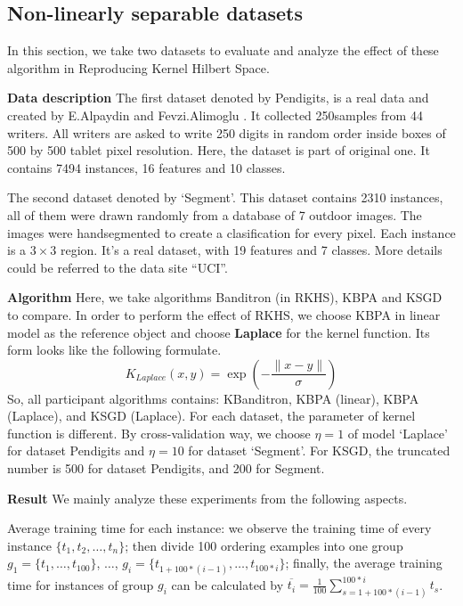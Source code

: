 \documentclass[twocolumn]{article}
\begin{document}
\subsection{Non-linearly separable datasets}

In this section, we take two datasets to evaluate and analyze the effect of these algorithm in Reproducing Kernel Hilbert Space.

\vspace{1.5ex}
\textbf{Data description}
The first dataset denoted by Pendigits, is a real data and created by E.Alpaydin and Fevzi.Alimoglu \cite{alimoglu1996combining,Alimoglu96methodsof}. 
It  collected 250samples from 44 writers. All writers are asked to write 250 digits in random order inside boxes of 500 by 500 tablet pixel resolution. 
Here, the dataset is part of original one. It contains 7494 instances, 16 features and 10 classes. 

The second dataset denoted by `Segment'\cite{Lichman:2013}. This dataset contains 2310 instances, all of them were drawn randomly from a database of 7 outdoor images. The images were handsegmented to create a clasification for every pixel. Each instance is a $3\times 3$ region. It's a real dataset, with 19 features and 7 classes. More details could be referred to the data site ``UCI''.

\vspace{1.5ex}
\textbf{Algorithm}
Here, we take algorithms Banditron (in RKHS), KBPA and KSGD to compare. In order to perform the effect of RKHS, we choose KBPA in linear model as the reference object and choose \textbf{Laplace} for the kernel function. Its form looks like the following formulate.
\[K_{Laplace}(x,y) = \exp{\left(-\frac{\parallel{x-y}\parallel}{\sigma}\right)}\]
So, all participant algorithms contains: KBanditron, KBPA (linear), KBPA (Laplace), and KSGD (Laplace). For each dataset, the parameter of kernel function is different. By cross-validation way, we choose $\eta = 1$ of model `Laplace' for dataset Pendigits and $\eta = 10$ for dataset `Segment'. For KSGD, the truncated number is 500 for dataset Pendigits, and 200 for Segment.

\vspace{1.5ex}
\textbf{Result}
We mainly analyze these experiments from the following aspects. 

Average training time for each instance:  we observe the training time of every instance $\{t_1,t_2,\dots,t_n\}$; then divide 100 ordering examples into one group $g_1 = \{t_1,\dots,t_{100}\}$,
$\dots$, $g_i = \{t_{1+100*(i-1)},\dots, t_{100*i}\}$; finally, the average training time for instances of group $g_i$ can be calculated by $\overline{t_i} = \frac{1}{100}\sum_{s=1+100*(i-1)}^{100*i} t_s$. 
\end{document}
